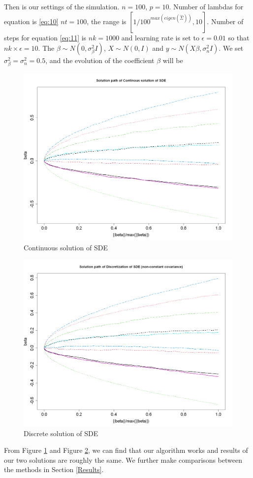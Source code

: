 \documentclass[11pt]{article}
\begin{document}
Then is our settings of the simulation. $n=100$, $p=10$. Number of lambdas for equation is \ref{eq:10} $nt=100$, the range is $[1/100^{max(eigen(\hat{\Sigma}))},10]$. Number of steps for equation \ref{eq:11} is $nk=1000$ and learning rate is set to $\epsilon=0.01$ so that $nk \times \epsilon = 10$. The $\beta \sim N(0,\sigma^2_{\beta} I)$, $X \sim N(0, I)$ and $y \sim N(X\beta,\sigma^2_{n} I)$. We set $\sigma^2_{\beta} = \sigma^2_{n} = 0.5$, and the evolution of the coefficient $\beta$ will be

\begin{figure}[p]
\centering
\includegraphics[width=0.75\linewidth]{fig1.png}
\caption{Continuous solution of SDE}
\label{fig:Conti_sde}
\end{figure}

\begin{figure}[p]
\centering
\includegraphics[width=0.75\linewidth]{fig2.png}
\caption{Discrete solution of SDE}
\label{fig:C_sde}
\end{figure}

From Figure \ref{fig:Conti_sde} and Figure \ref{fig:C_sde}, we can find that our algorithm works and results of our two solutions are roughly the same. We further make comparisons between the methods in Section \ref{Results}.
\end{document}

